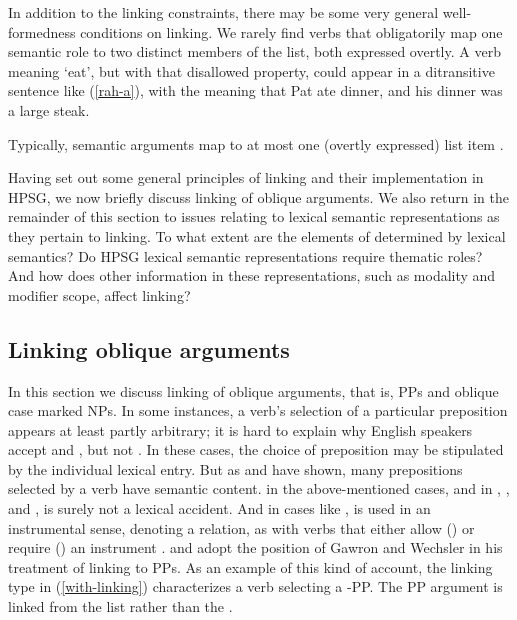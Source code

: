 \documentclass[output=paper
	        ,collection
	        ,collectionchapter
 	        ,biblatex
                ,babelshorthands
                ,newtxmath
                ,draftmode
                ,colorlinks, citecolor=brown
]{langscibook}
\begin{document}
In addition to the linking constraints, there may be some very general well-formedness conditions on linking.  We rarely find verbs that obligatorily map one semantic role to two distinct members of the \argst list, both expressed overtly.  A verb meaning `eat', but with that disallowed property, could appear in a ditransitive sentence like (\ref{rah-a}), with the meaning that Pat ate dinner, and his dinner was a large steak.  

\begin{exe}
\end{exe}

\noindent
Typically, semantic arguments map to at most one (overtly expressed) \argst list item \citep[262--268]{Davis2001}.

Having set out some general principles of linking and their implementation in HPSG, we now briefly discuss linking of oblique arguments.
We also return in the remainder of this section to issues relating to lexical semantic representations as they pertain to linking.
To what extent are the elements of \argst determined by lexical semantics?
Do HPSG lexical semantic representations require thematic roles?
And how does other information in these representations, such as modality and modifier scope, affect linking?

\subsection{Linking oblique arguments}
In this section we discuss linking of oblique arguments, that is, PPs and oblique case marked NPs.
In some instances, a verb's selection of a particular preposition appears at least partly arbitrary;
it is hard to explain why English speakers accept  and , but  not .
In these cases, the choice of preposition may be stipulated by the individual lexical entry.
But as \citet{Gawron1986} and \citet{Wechsler1995} have shown, many prepositions selected by a verb have semantic content.
 in the above-mentioned cases, and in , , and , is surely not a lexical accident.
And in  cases like ,  is used in an instrumental sense, denoting a  relation, as with verbs that either allow () or require () an instrument \citep{KoenigandDavis2006}.
\citet{Davis1996} and \citet{Davis2001} adopt the position of Gawron and Wechsler in his treatment of linking to PPs.
As an example of this kind of account, the linking type in (\ref{with-linking}) characterizes a verb selecting a -PP. 
The PP argument is linked from the \rels list  rather than the . 
\end{document}
